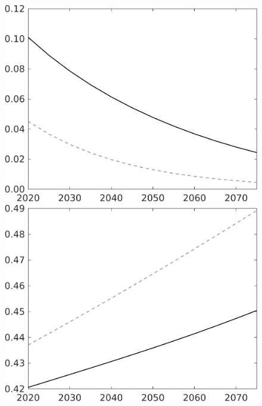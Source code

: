 \documentclass[12pt]{article}
\begin{document}
\begin{figure}[h!!]
\begin{minipage}[]{0.32\textwidth}
\end{minipage}	
\begin{minipage}[]{0.32\textwidth}
\includegraphics[width=1\textwidth]{../../codding_model/own_basedOnFried/optimalPol_010922_revision/figures/all_13Sept22/LevTaufNoTauf_TaulCalib_Equlab_regime0_pepn_spillover0_nsk1_xgr1_knspil1_sep1_LFlimit0_emsbase0_countec0_GovRev0_etaa0.79_lgd0.png}
\end{minipage}	
\begin{minipage}[]{0.32\textwidth}
\includegraphics[width=1\textwidth]{../../codding_model/own_basedOnFried/optimalPol_010922_revision/figures/all_13Sept22/LevTaufNoTauf_TaulCalib_Equlab_regime0_EY_spillover0_nsk1_xgr1_knspil1_sep1_LFlimit0_emsbase0_countec0_GovRev0_etaa0.79_lgd0.png}

\end{minipage}
\end{figure}
\end{document}
